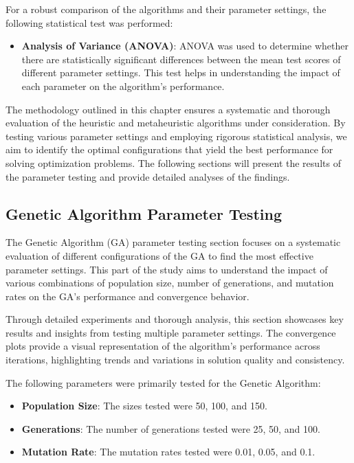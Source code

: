 \documentclass{article}
\begin{document}
    For a robust comparison of the algorithms and their parameter settings, the following statistical test was performed:

    \begin{itemize}
        \item \textbf{Analysis of Variance (ANOVA)}: ANOVA was used to determine whether there are statistically significant differences between the mean test scores of different parameter settings. This test helps in understanding the impact of each parameter on the algorithm's performance.
    \end{itemize}


    The methodology outlined in this chapter ensures a systematic and thorough evaluation of the heuristic and metaheuristic algorithms under consideration. By testing various parameter settings and employing rigorous statistical analysis, we aim to identify the optimal configurations that yield the best performance for solving optimization problems. The following sections will present the results of the parameter testing and provide detailed analyses of the findings.


    \newpage

    \subsection{Genetic Algorithm Parameter Testing}
    The Genetic Algorithm (GA) parameter testing section focuses on a systematic evaluation of different configurations of the GA to find the most effective parameter settings. This part of the study aims to understand the impact of various combinations of population size, number of generations, and mutation rates on the GA's performance and convergence behavior.

    Through detailed experiments and thorough analysis, this section showcases key results and insights from testing multiple parameter settings. The convergence plots provide a visual representation of the algorithm's performance across iterations, highlighting trends and variations in solution quality and consistency.

    The following parameters were primarily tested for the Genetic Algorithm:

    \begin{itemize}
        \item \textbf{Population Size}: The sizes tested were 50, 100, and 150.
        \item \textbf{Generations}: The number of generations tested were 25, 50, and 100.
        \item \textbf{Mutation Rate}: The mutation rates tested were 0.01, 0.05, and 0.1.
    \end{itemize}
\end{document}
